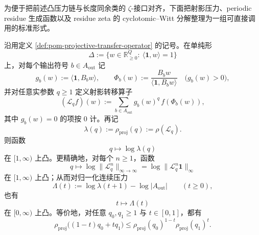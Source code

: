 为便于把前述凸压力链与长度同余类的 \(\zeta\)-接口对齐，下面把射影压力、periodic residue 生成函数以及 residue zeta 的 cyclotomic--Witt 分解整理为一组可直接调用的标准形式。

\begin{theorem}[射影压力算子谱半径的单纯形凸性证书]\label{thm:xi-time-part50dc-projective-pressure-perron-logconvex}
沿用定义 \ref{def:pom-projective-transfer-operator} 的记号。在单纯形
\[
\Delta:=\{w\in\mathbb R_{\ge 0}^{Q}:\ \langle \mathbf 1,w\rangle=1\}
\]
上，对每个输出符号 \(b\in A_{\mathrm{out}}\) 记
\[
g_b(w):=\langle \mathbf 1,B_bw\rangle,
\qquad
\Phi_b(w):=\frac{B_bw}{\langle \mathbf 1,B_bw\rangle}
\quad \bigl(g_b(w)>0\bigr),
\]
并对任意实参数 \(q\ge 1\) 定义射影转移算子
\[
(\mathcal L_qf)(w):=
\sum_{b\in A_{\mathrm{out}}}g_b(w)^q\,f(\Phi_b(w)),
\]
其中 \(g_b(w)=0\) 的项按 \(0\) 计。再记
\[
\lambda(q):=\rho_{\mathrm{proj}}(q):=\rho(\mathcal L_q).
\]
则函数
\[
q\longmapsto \log \lambda(q)
\]
在 \([1,\infty)\) 上凸。更精确地，对每个 \(n\ge 1\)，函数
\[
q\longmapsto \log \|\mathcal L_q^n\|_{\infty\to\infty}
=
\log \|\mathcal L_q^n\mathbf 1\|_\infty
\]
在 \([1,\infty)\) 上凸；从而对归一化连续压力
\[
\Lambda(t):=\log \lambda(t+1)-\log |A_{\mathrm{out}}|
\qquad (t\ge 0),
\]
也有
\[
t\longmapsto \Lambda(t)
\]
在 \([0,\infty)\) 上凸。等价地，对任意 \(q_0,q_1\ge 1\) 与 \(t\in[0,1]\)，都有
\[
\rho_{\mathrm{proj}}\bigl((1-t)q_0+tq_1\bigr)
\le
\rho_{\mathrm{proj}}(q_0)^{1-t}\rho_{\mathrm{proj}}(q_1)^t.
\]
\end{theorem}
